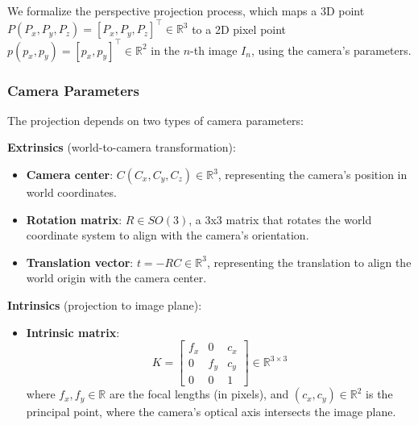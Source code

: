 \documentclass{article}
\begin{document}
We formalize the perspective projection process, which maps a 3D point \( P(P_x, P_y, P_z) = [P_x, P_y, P_z]^\top \in \mathbb{R}^3 \) to a 2D pixel point \( p(p_x, p_y) = [p_x, p_y]^\top \in \mathbb{R}^2 \) in the \( n \)-th image \( I_n \), using the camera’s parameters.

\subsubsection*{Camera Parameters}
The projection depends on two types of camera parameters:

\textbf{Extrinsics} (world-to-camera transformation):
\begin{itemize}
    \item \textbf{Camera center}: \( C(C_x, C_y, C_z) \in \mathbb{R}^3 \), representing the camera’s position in world coordinates.
    \item \textbf{Rotation matrix}: \( R \in SO(3) \), a 3x3 matrix that rotates the world coordinate system to align with the camera’s orientation.
    \item \textbf{Translation vector}: \( t = -R C \in \mathbb{R}^3 \), representing the translation to align the world origin with the camera center.
\end{itemize}

\textbf{Intrinsics} (projection to image plane):
\begin{itemize}
    \item \textbf{Intrinsic matrix}:
    \[
    K = \begin{bmatrix}
        f_x & 0 & c_x \\
        0 & f_y & c_y \\
        0 & 0 & 1
    \end{bmatrix} \in \mathbb{R}^{3 \times 3}
    \]
    where \( f_x, f_y \in \mathbb{R} \) are the focal lengths (in pixels), and \( (c_x, c_y) \in \mathbb{R}^2 \) is the principal point, where the camera’s optical axis intersects the image plane.
\end{itemize}
\end{document}
